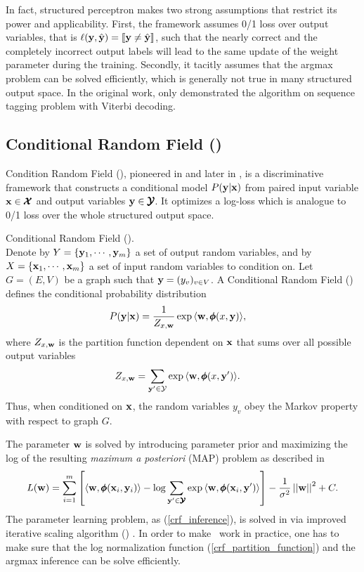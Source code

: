 {In fact, structured perceptron makes two strong assumptions that restrict its power and applicability.
First, the framework assumes 0/1 loss over output variables, that is $\mathbf {\ell}(\mathbf {y},\hat{\mathbf {y}})={\llbracket \mathbf {y}\neq\hat{\mathbf {y}} \rrbracket}$, such that the nearly correct and the completely incorrect output labels will lead to the same update of the weight parameter during the training.
Secondly, it tacitly assumes that the argmax problem can be solved efficiently, which is generally not true in many structured output space.
In the original work, \citet{collins02a} only demonstrated the algorithm on sequence tagging problem with Viterbi decoding.



%
\subsection{Conditional Random Field (\crf)}
Condition Random Field (\crf), pioneered in \citep{lafferty01} and later in \citep{taskar02}, is a discriminative framework that constructs a conditional model $P(\mathbf {y}|\mathbf {x})$ from paired input variable $\mathbf {x}\in\pmb {\mathcal{X}}$ and output variables $\mathbf {y}\in\pmb {\mathcal{Y}}$.
It optimizes a log-loss which is analogue to 0/1 loss over the whole structured output space.
\begin{definition}{Conditional Random Field (\crf).}\\
	Denote by $Y=\{\mathbf {y}_1,\cdots,\mathbf {y}_m\}$ a set of output random variables, and by $X=\{\mathbf {x}_1,\cdots,\mathbf {x}_m\}$ a set of input random variables to condition on.
	Let $G=(E,V)$ be a graph such that $\mathbf {y} = (y_v)_{v\in V}$.
	A Conditional Random Field (\crf) defines the conditional probability distribution
	\begin{align*}
		P(\mathbf {y}|\mathbf {x}) &= \frac{1}{Z_{x,\mathbf {w}}}\exp{\langle \mathbf {w}, \pmb \phi(x,\mathbf {y}) \rangle},
	\end{align*}
	where $Z_{x,\mathbf {w}}$ is the partition function dependent on $\mathbf {x}$ that sums over all possible output variables 
	\begin{align}
		Z_{x,\mathbf {w}} &= \sum_{\mathbf {y}'\in\mathcal{Y}}\exp{\langle \mathbf {w}, \pmb \phi(x,\mathbf {y}') \rangle}. \label{crf_partition_function}
	\end{align}
	Thus, when conditioned on $\mathbf {x}$, the random variables $y_v$ obey the Markov property with respect to graph $G$.
\end{definition}

The parameter $\mathbf {w}$ is solved by introducing parameter prior and maximizing the log of the resulting \textit{maximum a posteriori} (MAP) problem as described in \citep{taskar02}
\begin{align}
	L(\mathbf {w}) = \sum_{i=1}^{m}\left[\langle \mathbf {w}, \pmb \phi(\mathbf {x}_i,\mathbf {y}_i) \rangle-\log{\sum_{\mathbf {y}'\in\pmb {\mathcal{Y}}}{\exp{\langle \mathbf {w}, \pmb \phi(\mathbf {x}_i,\mathbf {y}') \rangle}}}\right] - \frac{1}{\sigma^2}\left|\left| \mathbf {w} \right|\right|^2 + C. \label{crf_inference}
\end{align}
The parameter learning problem, as (\ref{crf_inference}), is solved in \citep{lafferty01} via improved iterative scaling algorithm (\iis) \citep{Pietra97inducing}.
In order to make \crf\ work in practice, one has to make sure that the log normalization function (\ref{crf_partition_function}) and the argmax inference can be solve efficiently.


}
